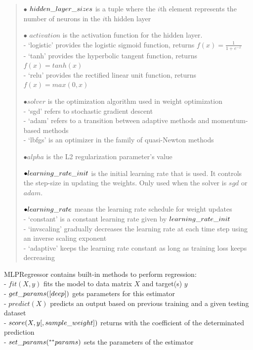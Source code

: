 \begin{verse}
	$\bullet$ $hidden\char`_layer\char`_sizes$ is a tuple where the $i$th element represents the number of neurons in the $i$th hidden layer
	
	$\bullet$ $activation$ is the activation function for the hidden layer.\\
	\hspace{11pt} - ‘logistic’ provides the logistic sigmoid function, returns $f(x) = \frac{1}{1 + e^{-x}}$\\
	\hspace{8pt} - ‘tanh’ provides the hyperbolic tangent function, returns $f(x) = tanh(x)$\\
	\hspace{8pt} - ‘relu’ provides the rectified linear unit function, returns $f(x) = max(0, x)$ 
	
	$\bullet solver$ is the optimization algorithm used in weight optimization\\
	\hspace{9pt} - ‘sgd’ refers to stochastic gradient descent\\
	\hspace{10pt} - ‘adam’ refers to a transition between adaptive methods and momentum-based methods\\
	\hspace{10pt} - ‘lbfgs’ is an optimizer in the family of quasi-Newton methods
	
	$\bullet alpha$ is the L2 regularization parameter's value
	
	$\bullet learning\char`_rate\char`_init$ is the initial learning rate that is used. It controls the step-size in updating the weights. Only used when the solver is $sgd$ or $adam$.
	
	$\bullet learning\char`_rate$ means the learning rate schedule for weight updates \\
	\hspace{10pt} - ‘constant’ is a constant learning rate given by $learning\char`_rate\char`_init$\\
	\hspace{10pt} - ‘invscaling’ gradually decreases the learning rate at each time step using an inverse scaling exponent\\
	\hspace{10pt} - ‘adaptive’ keeps the learning rate constant as long as training loss keeps decreasing
\end{verse}
MLPRegressor contains built-in methods to perform regression:\\
- $fit(X, y)$ fits the model to data matrix $X$ and target(s) $y$\\
- $get\char`_params([deep])$ gets parameters for this estimator\\
- $predict(X)$ predicts an output based on previous training and a given testing dataset\\
- $score(X, y[, sample\char`_weight])$ returns with the coefficient of the determinated prediction\\
- $set\char`_params(^{**} params)$ sets the parameters of the estimator\bigskip

